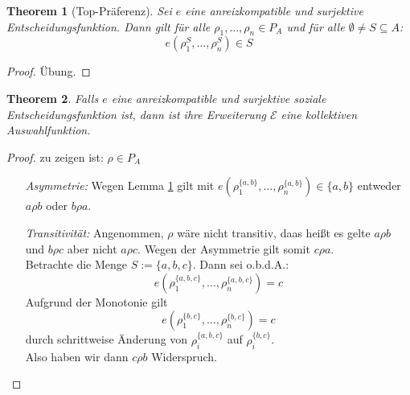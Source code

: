 \documentclass[]{article}
\newtheorem{thm}{Theorem}
\begin{document}
\begin{thm}[Top-Präferenz] \label{Top_Praeferenz_Lemma}
	Sei $e$ eine anreizkompatible und surjektive Entscheidungsfunktion. Dann gilt für alle $\rho_1, \dots, \rho_n \in P_A$ und für alle $\emptyset \neq S \subseteq A$:
	\[ e(\rho_1^S, \dots, \rho^S_n) \in S \]
\end{thm}
\begin{proof}
	Übung. %
\end{proof}

\begin{thm}
	Falls $e$ eine anreizkompatible und surjektive soziale Entscheidungsfunktion ist, dann ist ihre Erweiterung $\mathcal{E}$ eine kollektiven Auswahlfunktion.
\end{thm}
\begin{proof}
	zu zeigen ist: $\rho \in P_A$ \\
	\begin{itemize}
		\item[\it Asymmetrie:] Wegen Lemma \ref{Top_Praeferenz_Lemma} gilt mit $e\left(\rho_1^{\{a, b \}}, \dots, \rho_n^{\{a, b \}} \right) \in \{a,b\}$ entweder $a \rho b$ oder $b \rho a$. 
		\item[\it Transitivität:] Angenommen, $\rho$ wäre nicht transitiv, daas heißt es gelte $a \rho b$ und $b \rho c$ aber nicht $a \rho c$. 
		Wegen der Asymmetrie gilt somit $c \rho a$.\\
		Betrachte die Menge $S := \{a,b,c\}$. Dann sei o.b.d.A.:
		\[ e\left(\rho_1^{\{a, b,c \}}, \dots, \rho_n^{\{a, b, c \}} \right) = c \]
		Aufgrund der Monotonie gilt
		\[  e\left(\rho_1^{\{b, c \}}, \dots, \rho_n^{\{b, c \}} \right) = c \]
		durch schrittweise Änderung von $\rho_i^{\{a,b,c\}}$ auf $\rho_i^{\{b,c\}}$. \\
		Also haben wir dann $c \rho b$ Widerspruch.
	\end{itemize}
\end{proof}
\end{document}
